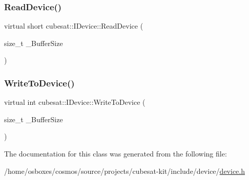 \mbox{\label{classcubesat_1_1IDevice_a75ffdd9dd5569321f04179a1ac0966d6}} 
\subsubsection{\texorpdfstring{Read\+Device()}{ReadDevice()}}
{\footnotesize\ttfamily virtual short cubesat\+::\+I\+Device\+::\+Read\+Device (\begin{DoxyParamCaption}\item[{size\+\_\+t}]{\+\_\+\+Buffer\+Size }\end{DoxyParamCaption})\hspace{0.3cm}{\ttfamily [pure virtual]}}

\mbox{\label{classcubesat_1_1IDevice_a0972602fbc825d3c34eeec8798f94d6c}} 
\subsubsection{\texorpdfstring{Write\+To\+Device()}{WriteToDevice()}}
{\footnotesize\ttfamily virtual int cubesat\+::\+I\+Device\+::\+Write\+To\+Device (\begin{DoxyParamCaption}\item[{size\+\_\+t}]{\+\_\+\+Buffer\+Size }\end{DoxyParamCaption})\hspace{0.3cm}{\ttfamily [pure virtual]}}



The documentation for this class was generated from the following file\+:\begin{DoxyCompactItemize}
\item 
/home/osboxes/cosmos/source/projects/cubesat-\/kit/include/device/\hyperlink{device_8h}{device.\+h}\end{DoxyCompactItemize}
